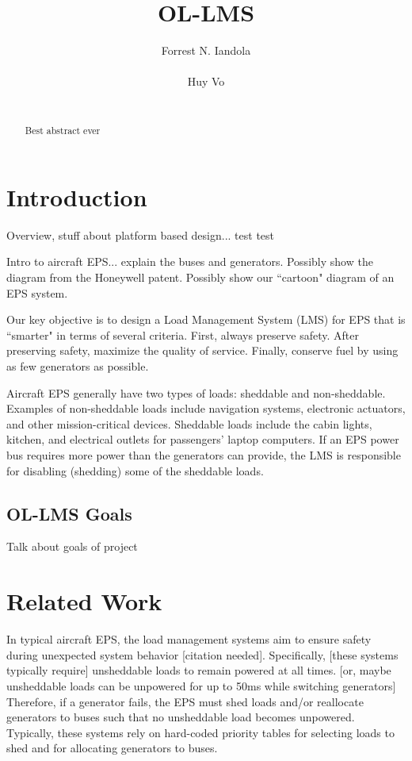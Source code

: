 \documentclass{acm_proc_article-sp}
\begin{document}
\title{OL-LMS}

\author{
\alignauthor
Forrest N. Iandola\\
       \\
\alignauthor
Huy Vo\\
       \\
}

\maketitle
\begin{abstract}
Best abstract ever
\end{abstract}


\section{Introduction}
Overview, stuff about platform based design... test test

Intro to aircraft EPS... explain the buses and generators.
Possibly show the diagram from the Honeywell patent.
Possibly show our ``cartoon" diagram of an EPS system.

Our key objective is to design a Load Management System (LMS) for EPS that is ``smarter" in terms of several criteria.
First, always preserve safety.
After preserving safety, maximize the quality of service.
Finally, conserve fuel by using as few generators as possible.

Aircraft EPS generally have two types of loads: sheddable and non-sheddable.
Examples of non-sheddable loads include navigation systems, electronic actuators, and other mission-critical devices.
Sheddable loads include the cabin lights, kitchen, and electrical outlets for passengers' laptop computers.
If an EPS power bus requires more power than the generators can provide, the LMS is responsible for disabling (shedding) some of the sheddable loads.

\subsection{OL-LMS Goals}
Talk about goals of project

\section{Related Work}
\label{sec:related-work}
In typical aircraft EPS, the load management systems aim to ensure safety during unexpected system behavior [citation needed].
Specifically, [these systems typically require] unsheddable loads to remain powered at all times. [or, maybe unsheddable loads can be unpowered for up to 50ms while switching generators]
Therefore, if a generator fails, the EPS must shed loads and/or reallocate generators to buses such that no unsheddable load becomes unpowered.
Typically, these systems rely on hard-coded priority tables for selecting loads to shed and for allocating generators to buses.
\end{document}
